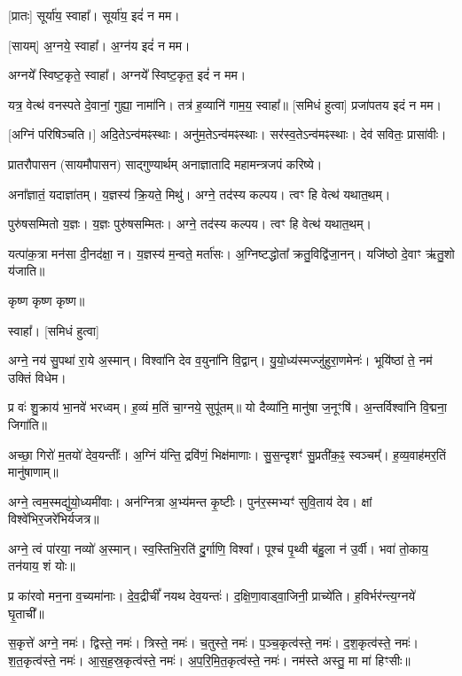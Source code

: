 [प्रातः] सूर्या॑य॒ स्वाहा᳚। सूर्या॑य॒ इदं॑ न मम।

[सायम्] अ॒ग्नये॒ स्वाहा᳚। अ॒ग्न॑य इदं॑ न मम।

अग्नये᳚ स्विष्ट॒कृते॒ स्वाहा᳚। अग्नये᳚ स्विष्ट॒कृत॒ इदं॑ न मम।


यत्र॒ वेत्थ॑ वनस्पते दे॒वानां॒ गुह्या॒ नामा॑नि। तत्र॑ ह॒व्यानि॑ गाम॒य॒ स्वाहा᳚॥ [समिधं हुत्वा]
प्रजा॑पतय इदं न मम। 

[अग्निं परिषिञ्चति।]
अदि॒तेऽन्व॑मꣴस्थाः। अनु॑म॒तेऽन्व॑मꣴस्थाः। सर॑स्व॒तेऽन्व॑मꣴस्थाः। देव॑ सवितः॒ प्रासा॑वीः।


प्रातरौपासन (सायमौपासन) साद्गुण्यार्थम् अनाज्ञातादि महामन्त्रजपं करिष्ये।

अना᳚ज्ञातं॒ यदाज्ञा॑तम्। य॒ज्ञस्य॑ क्रि॒यते॒ मिथु॑।
अग्ने॒ तद॑स्य कल्पय। त्वꣳ हि वेत्थ॑ यथात॒थम्।

पुरु॑षसम्मितो य॒ज्ञः। य॒ज्ञः पुरु॑षसम्मितः।
अग्ने॒ तद॑स्य कल्पय। त्वꣳ हि वेत्थ॑ यथात॒थम्।

यत्पा॑क॒त्रा मन॑सा दी॒नद॑क्षा॒ न। य॒ज्ञस्य॑ म॒न्वते॒ मर्ता॑सः।
अ॒ग्निष्टद्धोता᳚ क्रतु॒विद्वि॑जा॒नन्। यजि॑ष्ठो दे॒वाꣳ ऋ॑तु॒शो य॑जाति॥

कृष्ण कृष्ण कृष्ण॥

स्वाहा᳚। [समिधं हुत्वा]


अग्ने॒ नय॑ सु॒पथा॑ रा॒ये अ॒स्मान्। विश्वा॑नि देव व॒युना॑नि वि॒द्वान्। यु॒यो॒ध्य॑स्मज्जु॑हुरा॒णमेनः॑। भूयि॑ष्ठां ते॒ नम॑ उक्तिं विधेम। 

प्र वः॑ शु॒क्राय॑ भा॒नवे॑ भरध्वम्। ह॒व्यं म॒तिं चा॒ग्नये॒ सुपू॑तम्॥ यो दैव्या॑नि॒ मानु॑षा ज॒नूꣳषि॑। अ॒न्तर्विश्वा॑नि वि॒द्मना॒ जिगा॑ति॥

अच्छा॒ गिरो॑ म॒तयो॑ देव॒यन्तीः᳚। अ॒ग्निं य॑न्ति॒ द्रवि॑णं॒ भिक्ष॑माणाः।
सु॒स॒न्दृशꣳ॑ सु॒प्रती॑क॒ꣴ॒ स्वञ्चम्᳚। ह॒व्य॒वाह॑मर॒तिं मानु॑षाणाम्॥

अग्ने॒ त्वम॒स्मद्यु॑यो॒ध्यमी॑वाः। अन॑ग्नित्रा अ॒भ्य॑मन्त कृ॒ष्टीः।
पुन॑र॒स्मभ्यꣳ॑ सुवि॒ताय॑ देव। क्षां विश्वे॑भिर॒जरे॑भिर्यजत्र॥ 

अग्ने॒ त्वं पा॑रया॒ नव्यो॑ अ॒स्मान्। स्व॒स्तिभि॒रति॑ दु॒र्गाणि॒ विश्वा᳚।
पूश्च॑ पृ॒थ्वी ब॑हु॒ला न॑ उ॒र्वी। भवा॑ तो॒काय॒ तन॑याय॒ शं योः॥

प्र का॑रवो मन॒ना व॒च्यमा॑नाः। दे॒व॒द्रीचीं᳚ नयथ देव॒यन्तः॑।
द॒क्षि॒णा॒वाड्वा॒जिनी॒ प्राच्ये॑ति। ह॒विर्भर॑न्त्य॒ग्नये॑ घृ॒ताची᳚॥

स॒कृत्ते॑ अग्ने॒ नमः॑। द्विस्ते॒ नमः॑। त्रिस्ते॒ नमः॑। च॒तुस्ते॒ नमः॑। प॒ञ्च॒कृत्व॑स्ते॒ नमः॑। द॒श॒कृत्व॑स्ते॒ नमः॑। श॒त॒कृत्व॑स्ते॒ नमः॑। आ॒स॒ह॒स्र॒कृत्व॑स्ते॒ नमः॑। अ॒प॒रि॒मि॒त॒कृत्व॑स्ते॒ नमः॑। नम॑स्ते अस्तु॒ मा मा॑ हिꣳसीः॥

